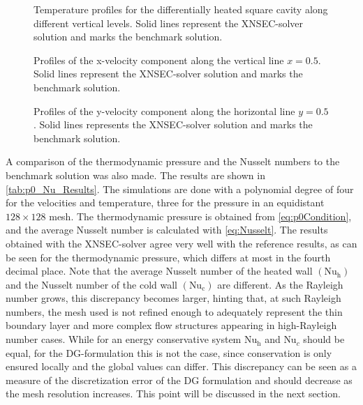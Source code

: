\begin{figure}[h]
	\centering
	\pgfplotsset{width=0.22\textwidth, compat=1.3} 
	\caption{Temperature profiles for the differentially heated square cavity along different vertical levels. Solid lines represent the XNSEC-solver solution and marks the benchmark solution.}
	\label{fig:TempProfile}
\end{figure}
%
\begin{figure}[h]
	\centering
	\pgfplotsset{width=0.22\textwidth, compat=1.3}
	\caption{Profiles of the x-velocity component along the vertical line $x=0.5$. Solid lines represent the XNSEC-solver solution and marks the benchmark solution.}
	\label{fig:VelocityXProfile}
\end{figure}
%
\begin{figure}[h]
	\centering
	\pgfplotsset{width=0.22\textwidth, compat=1.3}
	\caption{Profiles of the y-velocity component along the horizontal line $y=0.5$. Solid lines represents the XNSEC-solver solution and marks the benchmark solution.}
	\label{fig:VelocityYProfile}
\end{figure}
\FloatBarrier
A comparison of the thermodynamic pressure and the Nusselt numbers to the benchmark solution was also made. The results are shown in \cref{tab:p0_Nu_Results}. The simulations are done with a polynomial degree of four for the velocities and temperature, three for the pressure in an equidistant $128\times128$ mesh. The thermodynamic pressure is obtained from \cref{eq:p0Condition}, and the average Nusselt number is calculated with \cref{eq:Nusselt}. The results obtained with the XNSEC-solver agree very well with the reference results, as can be seen for the thermodynamic pressure, which differs at most in the fourth decimal place. Note that the average Nusselt number of the heated wall $(\text{Nu}_\text{h})$ and the Nusselt number of the cold wall $(\text{Nu}_\text{c})$ are different. As the Rayleigh number grows, this discrepancy becomes larger, hinting that, at such Rayleigh numbers, the mesh used is not refined enough to adequately represent the thin boundary layer and more complex flow structures appearing in high-Rayleigh number cases. While for an energy conservative system $\text{Nu}_\text{h}$ and $\text{Nu}_c$ should be equal, for the DG-formulation this is not the case, since conservation is only ensured locally and the global values can differ. This discrepancy can be seen as a measure of the discretization error of the DG formulation and should decrease as the mesh resolution increases. This point will be discussed in the next section.
